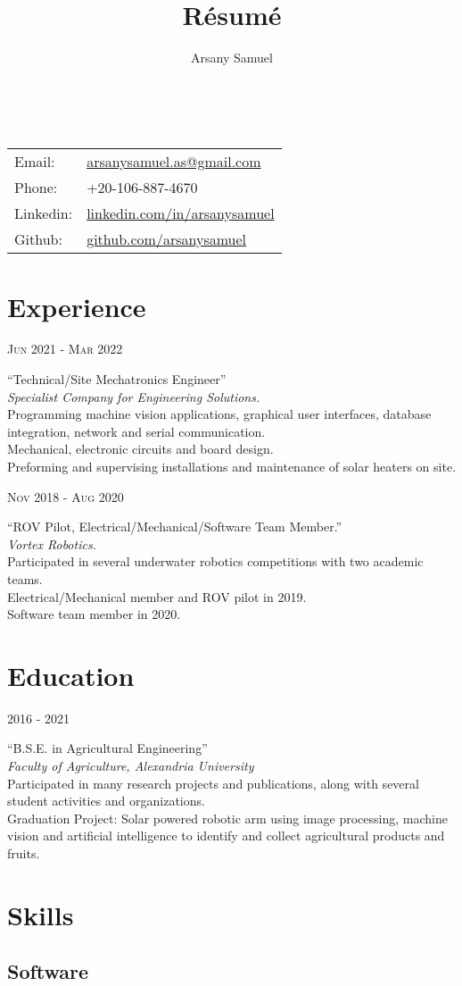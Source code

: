 \documentclass[a4paper]{article}
\title{R\'esum\'e}
\author{Arsany Samuel}
\makeatletter
\renewcommand{\maketitle}{
	\begin{center}
		{\Huge\bfseries{\theauthor}}\\
			\vspace{0.5em}
		{
			\begin{center}
				\large\begin{tabular}{l  l}
					Email: & \href{mailto:arsanysamuel.as@gmail.com}{arsanysamuel.as@gmail.com}  \\ 
					Phone: & +20-106-887-4670  \\
					Linkedin: & \href{https://linkedin.com/in/arsanysamuel}{linkedin.com/in/arsanysamuel}  \\
					Github: & \href{https://github.com/arsanysamuel}{github.com/arsanysamuel}
				\end{tabular}
			\end{center}
		}
	\end{center}
}
\newcommand{\ag}{Agricultural Engineering}
\newcommand{\foa}{Faculty of Agriculture}
\newcommand{\au}{Alexandria University}
\newcommand{\entry}[4]{   %
	\begin{center}
		\begin{minipage}[c]{0.25\linewidth}  %
			\vfill
			\hfill  %
			\textsc{#1}  %
			\vfill
		\end{minipage}
		\hfill\vline\hfill  %
		\begin{minipage}[c]{0.7\linewidth}
			\textrm{``#2''} \\
			\textit{#3} \\
			\footnotesize{#4}
		\end{minipage}
	\end{center}
}
\makeatother
\begin{document}
	\maketitle
	

	\section{Experience}
		\entry{Jun 2021 - Mar 2022}
			{Technical/Site Mechatronics Engineer}
			{Specialist Company for Engineering Solutions.}
			{Programming machine vision applications, graphical user interfaces, database integration, network and serial communication.\\Mechanical, electronic circuits and board design.\\Preforming and supervising installations and maintenance of solar heaters on site.}
		\entry{Nov 2018 - Aug 2020}
			{ROV Pilot, Electrical/Mechanical/Software Team Member.}
			{Vortex Robotics.}
			{Participated in several underwater robotics competitions with two academic teams.\\Electrical/Mechanical member and ROV pilot in 2019.\\Software team member in 2020.}

	\section{Education}
		\entry{2016 - 2021}
			{B.S.E. in \ag}
			{\foa, \au }
			{
				Participated in many research projects and publications, along with several student activities and organizations.\\
				Graduation Project: Solar powered robotic arm using image processing, machine vision and artificial intelligence to identify and collect agricultural products and fruits.
			}



	\section{Skills}
		\subsection{Software}
\end{document}
